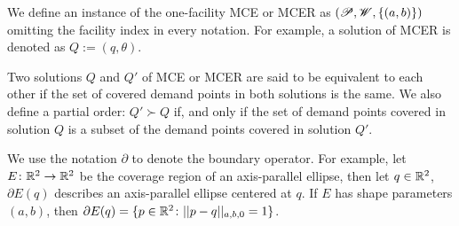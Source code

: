We define an instance of the one-facility MCE or MCER as $(\mathscr{P}, \mathscr{W}, \{(a,b)\})$ omitting the facility index in every notation. For example, a solution of MCER is denoted as $Q := (q, \theta)$.

Two solutions $Q$ and $Q'$ of MCE or MCER are said to be equivalent to each other if
the set of covered demand points in both solutions is the same.
We also define a partial order: $Q' \succ Q$ if, and only if the set of demand points covered in solution $Q$ is a subset of the demand points covered in solution $Q'$.

We use the notation $\partial$ to denote the boundary operator. For example, let $E \colon \mathbb{R}^2\to\mathbb{R}^2$ be the coverage region of an axis-parallel ellipse, then let $q\in\mathbb{R}^2$, $\partial E(q)$ describes an axis-parallel ellipse centered at $q$. If $E$ has shape parameters $(a, b)$, then $\partial E(q) = \{p \in \mathbb{R}^2\colon ||p-q||_{a,b,0} = 1\}$.

